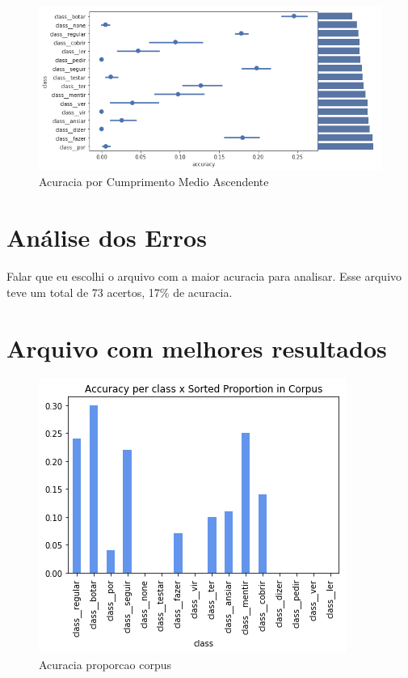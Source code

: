 \begin{figure}[H]
  \centering
  \includegraphics[width=1.0\linewidth]{img/accuracy_by_len.png}
  \caption{Acuracia por Cumprimento Medio Ascendente}
  \label{fig:kfoldprop}
\end{figure}


\section{Análise dos Erros}

Falar que eu escolhi o arquivo com a maior acuracia para analisar. Esse arquivo teve um total de 73 acertos, 17\% de acuracia.


\section{Arquivo com melhores resultados}

\begin{figure}[H]
  \centering
  \includegraphics[width=0.7\linewidth]{img/best_file_accuracy.png}
  \caption{Acuracia proporcao corpus}
  \label{fig:acuraciaprop}
\end{figure}



